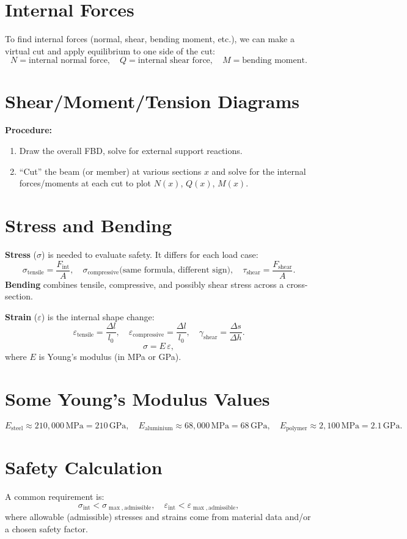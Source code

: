 \documentclass{article}
\begin{document}
\section{Internal Forces}
To find internal forces (normal, shear, bending moment, etc.), we can make a virtual cut and apply equilibrium to one side of the cut:
\[
N = \text{internal normal force},\quad
Q = \text{internal shear force},\quad
M = \text{bending moment}.
\]

\section{Shear/Moment/Tension Diagrams}
\textbf{Procedure:}
\begin{enumerate}
\item Draw the overall FBD, solve for external support reactions.
\item ``Cut'' the beam (or member) at various sections $x$ and solve for the internal forces/moments at each cut to plot $N(x)$, $Q(x)$, $M(x)$.
\end{enumerate}

\section{Stress and Bending}
\textbf{Stress} ($\sigma$) is needed to evaluate safety. It differs for each load case:
\[
\sigma_{\text{tensile}} = \frac{F_{\text{int}}}{A}, 
\quad
\sigma_{\text{compressive}} \text{(same formula, different sign)},
\quad
\tau_{\text{shear}} = \frac{F_{\text{shear}}}{A}.
\]
\textbf{Bending} combines tensile, compressive, and possibly shear stress across a cross-section.

\textbf{Strain} ($\varepsilon$) is the internal shape change:
\[
\varepsilon_{\text{tensile}} = \frac{\Delta l}{l_0}, 
\quad
\varepsilon_{\text{compressive}} = \frac{\Delta l}{l_0}, 
\quad
\gamma_{\text{shear}} = \frac{\Delta s}{\Delta h}.
\]
\[
\sigma = E\,\varepsilon,
\]
where $E$ is Young's modulus (in MPa or GPa).

\section{Some Young's Modulus Values}
\[
E_{\text{steel}} \approx 210{,}000\,\mathrm{MPa} = 210\,\mathrm{GPa}, \quad
E_{\text{aluminium}} \approx 68{,}000\,\mathrm{MPa} = 68\,\mathrm{GPa}, \quad
E_{\text{polymer}} \approx 2{,}100\,\mathrm{MPa} = 2.1\,\mathrm{GPa}.
\]

\section{Safety Calculation}
A common requirement is:
\[
\sigma_{\text{int}} < \sigma_{\max,\text{admissible}}, 
\quad
\varepsilon_{\text{int}} < \varepsilon_{\max,\text{admissible}},
\]
where allowable (admissible) stresses and strains come from material data and/or a chosen safety factor.
\end{document}
